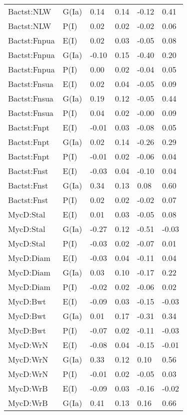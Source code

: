 \begin{center}
\begin{longtable}{|p{1.1in}|p{0.7in}|p{0.7in}|p{0.6in}|p{0.6in}|p{0.6in}|}
  Bactst:NLW & G(Ia) & 0.14 & 0.14 & -0.12 & 0.41 \\ 
  Bactst:NLW & P(I) & 0.02 & 0.02 & -0.02 & 0.06 \\ 
  Bactst:Fnpua & E(I) & 0.02 & 0.03 & -0.05 & 0.08 \\ 
  Bactst:Fnpua & G(Ia) & -0.10 & 0.15 & -0.40 & 0.20 \\ 
  Bactst:Fnpua & P(I) & 0.00 & 0.02 & -0.04 & 0.05 \\ 
  Bactst:Fnsua & E(I) & 0.02 & 0.04 & -0.05 & 0.09 \\ 
  Bactst:Fnsua & G(Ia) & 0.19 & 0.12 & -0.05 & 0.44 \\ 
  Bactst:Fnsua & P(I) & 0.04 & 0.02 & -0.00 & 0.09 \\ 
  Bactst:Fnpt & E(I) & -0.01 & 0.03 & -0.08 & 0.05 \\ 
  Bactst:Fnpt & G(Ia) & 0.02 & 0.14 & -0.26 & 0.29 \\ 
  Bactst:Fnpt & P(I) & -0.01 & 0.02 & -0.06 & 0.04 \\ 
  Bactst:Fnst & E(I) & -0.03 & 0.04 & -0.10 & 0.04 \\ 
  Bactst:Fnst & G(Ia) & 0.34 & 0.13 & 0.08 & 0.60 \\ 
  Bactst:Fnst & P(I) & 0.02 & 0.02 & -0.02 & 0.07 \\ 
  MycD:Stal & E(I) & 0.01 & 0.03 & -0.05 & 0.08 \\ 
  MycD:Stal & G(Ia) & -0.27 & 0.12 & -0.51 & -0.03 \\ 
  MycD:Stal & P(I) & -0.03 & 0.02 & -0.07 & 0.01 \\ 
  MycD:Diam & E(I) & -0.03 & 0.04 & -0.11 & 0.04 \\ 
  MycD:Diam & G(Ia) & 0.03 & 0.10 & -0.17 & 0.22 \\ 
  MycD:Diam & P(I) & -0.02 & 0.02 & -0.06 & 0.02 \\ 
  MycD:Bwt & E(I) & -0.09 & 0.03 & -0.15 & -0.03 \\ 
  MycD:Bwt & G(Ia) & 0.01 & 0.17 & -0.31 & 0.34 \\ 
  MycD:Bwt & P(I) & -0.07 & 0.02 & -0.11 & -0.03 \\ 
  MycD:WrN & E(I) & -0.08 & 0.04 & -0.15 & -0.01 \\ 
  MycD:WrN & G(Ia) & 0.33 & 0.12 & 0.10 & 0.56 \\ 
  MycD:WrN & P(I) & -0.01 & 0.02 & -0.05 & 0.03 \\ 
  MycD:WrB & E(I) & -0.09 & 0.03 & -0.16 & -0.02 \\ 
  MycD:WrB & G(Ia) & 0.41 & 0.13 & 0.16 & 0.66 \\ 

\end{longtable}
\end{center}
